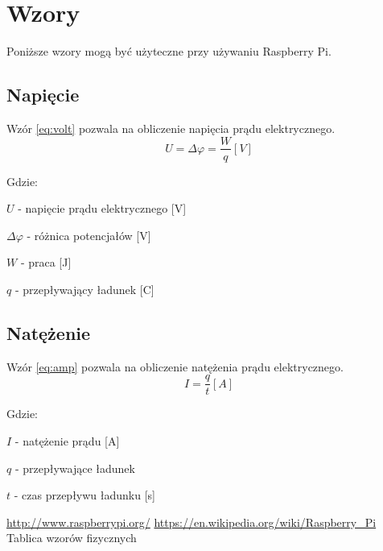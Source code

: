 \documentclass[titlepage]{article}
\begin{document}
\newpage
\section{Wzory}
Poniższe wzory\cite{wz} mogą być użyteczne przy używaniu Raspberry Pi.
\subsection{Napięcie}
Wzór \ref{eq:volt} pozwala na obliczenie napięcia prądu elektrycznego.
\begin{equation}
\label{eq:volt} U = \Delta\varphi = \frac{W}{q}[V] 
\end{equation}

Gdzie:

$ U $ - napięcie prądu elektrycznego [V]

$ \Delta\varphi $ - różnica potencjałów [V]

$ W $ - praca [J]

$ q $ - przepływający ładunek [C]

\subsection{Natężenie}
Wzór \ref{eq:amp} pozwala na obliczenie natężenia prądu elektrycznego.
\begin{equation}
\label{eq:amp}
I = \frac{q}{t}[A]
\end{equation} 

Gdzie:

$ I $ - natężenie prądu [A]

$ q $ - przepływające ładunek

$ t $ - czas przepływu ładunku [s]

\newpage
\begin{thebibliography}{99}
 \url{http://www.raspberrypi.org/}
 \url{https://en.wikipedia.org/wiki/Raspberry_Pi}
 Tablica wzorów fizycznych
\end{thebibliography}
\end{document}
